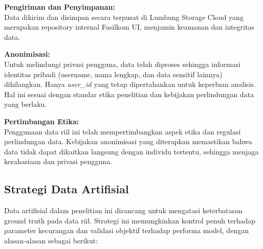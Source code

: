 \textbf{Pengiriman dan Penyimpanan:} \\
Data dikirim dan disimpan secara terpusat di Lumbung Storage Cloud yang merupakan repository internal Fasilkom UI, menjamin keamanan dan integritas data.

\textbf{Anonimisasi:} \\
Untuk melindungi privasi pengguna, data telah diproses sehingga informasi identitas pribadi (username, nama lengkap, dan data sensitif lainnya) dihilangkan. Hanya \textit{user\_id} yang tetap dipertahankan untuk keperluan analisis. Hal ini sesuai dengan standar etika penelitian dan kebijakan perlindungan data yang berlaku.

\textbf{Pertimbangan Etika:} \\
Penggunaan data riil ini telah mempertimbangkan aspek etika dan regulasi perlindungan data. Kebijakan anonimisasi yang diterapkan memastikan bahwa data tidak dapat dikaitkan langsung dengan individu tertentu, sehingga menjaga kerahasiaan dan privasi pengguna.

\subsection{Strategi Data Artifisial}
\label{sec:dataArtifisial}
Data artifisial dalam penelitian ini dirancang untuk mengatasi keterbatasan ground truth pada data riil. Strategi ini memungkinkan kontrol penuh terhadap parameter kecurangan dan validasi objektif terhadap performa model, dengan alasan-alasan sebagai berikut:

